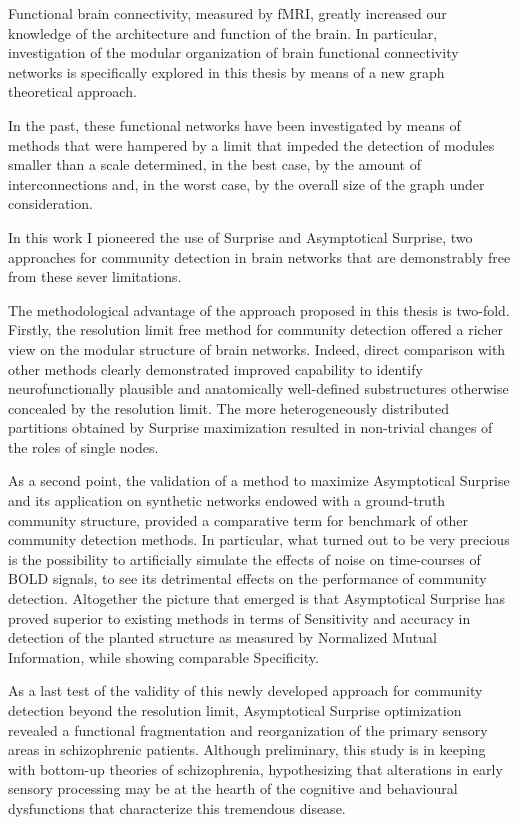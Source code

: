 Functional brain connectivity, measured by fMRI, greatly increased our knowledge of the architecture and function of the brain.
In particular, investigation of the modular organization of brain functional connectivity networks is specifically explored in this thesis by means of a new graph theoretical approach.

In the past, these functional networks have been investigated by means of methods that were hampered by a limit that impeded the detection of modules smaller than a scale determined, in the best case, by the amount of interconnections and, in the worst case, by the overall size of the graph under consideration.

In this work I pioneered the use of Surprise and Asymptotical Surprise, two approaches for community detection in brain networks that are demonstrably free from these sever limitations.

The methodological advantage of the approach proposed in this thesis is two-fold.
Firstly, the resolution limit free method for community detection offered a richer view on the modular structure of brain networks.
Indeed, direct comparison with other methods clearly demonstrated improved capability to identify neurofunctionally plausible and anatomically well-defined substructures otherwise concealed by the resolution limit.
The more heterogeneously distributed partitions obtained by Surprise maximization resulted in non-trivial changes of the roles of single nodes.

As a second point, the validation of a method to maximize Asymptotical Surprise and its application on synthetic networks endowed with a ground-truth community structure, provided a comparative term for benchmark of other community detection methods.
In particular, what turned out to be very precious is the possibility to artificially simulate the effects of noise on time-courses of BOLD signals, to see its detrimental effects on the performance of community detection.
Altogether the picture that emerged is that Asymptotical Surprise has proved superior to existing methods in terms of Sensitivity and accuracy in detection of the planted structure as measured by Normalized Mutual Information, while showing comparable Specificity.

As a last test of the validity of this newly developed approach for community detection beyond the resolution limit, Asymptotical Surprise optimization revealed a functional fragmentation and reorganization of the primary sensory areas in schizophrenic patients.
Although preliminary, this study is in keeping with bottom-up theories of schizophrenia, hypothesizing that alterations in early sensory processing may be at the hearth of the cognitive and behavioural dysfunctions that characterize this tremendous disease.

